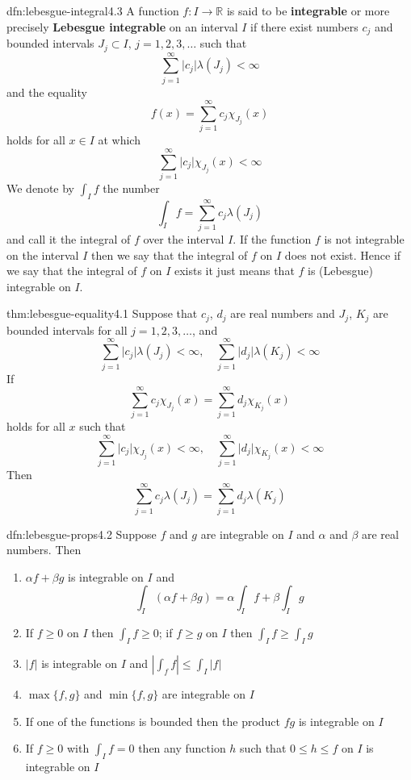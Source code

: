 \documentclass[landscape, 8pt]{extarticle}
\begin{document}
\begin{multicols}{3}
\begin{dfn}{dfn:lebesgue-integral}{4.3}
	A function $f:I\to \mathbb{R}$ is said to be \textbf{integrable} or more precisely \textbf{Lebesgue integrable} on an interval $I$ if there exist numbers $c_{j}$ and bounded intervals $J_{j}\subset I,\,j=1,2,3,\dots$ such that
	\[\sum_{j=1}^{\infty} \lvert c_{j} \rvert \lambda(J_{j})<\infty\]
	and the equality
	\[f(x)=\sum_{j=1}^{\infty} c_{j}\chi_{J_{j}}(x)\]
	holds for all $x\in I$ at which
	\[\sum_{j=1}^{\infty} \lvert c_{j} \rvert \chi_{J_{j}}(x)<\infty\]
	We denote by $\int_{I}f$ the number
	\[\int _{I}f=\sum_{j=1}^{\infty} c_{j}\lambda(J_{j})\]
	and call it the integral of $f$ over the interval $I$.
	If the function $f$ is not integrable on the interval $I$ then we say that the integral of $f$ on $I$ does not exist. Hence if we say that the integral of $f$ on $I$ exists it just means that $f$ is (Lebesgue) integrable on $I$.
\end{dfn}

\begin{thm}{thm:lebesgue-equality}{4.1}
	Suppose that $c_{j}$, $d_{j}$ are real numbers and $J_{j}$, $K_{j}$ are bounded intervals for all $j=1,2,3,\dots$, and
	\[\sum_{j=1}^{\infty} \lvert c_{j} \rvert \lambda(J_{j})<\infty,\quad \sum_{j=1}^{\infty} \lvert d_{j} \rvert \lambda(K_{j})<\infty\]
	If
	\[\sum_{j=1}^{\infty} c_{j}\chi_{J_{j}}(x)=\sum_{j=1}^{\infty} d_{j}\chi_{K_{j}}(x)\]
	holds for all $x$ such that
	\[\sum_{j=1}^{\infty} \lvert c_{j} \rvert \chi_{J_{j}}(x)<\infty,\quad \sum_{j=1}^{\infty} \lvert d_{j} \rvert \chi_{K_{j}}(x)<\infty\]
	Then
	\[\sum_{j=1}^{\infty} c_{j}\lambda(J_{j})=\sum_{j=1}^{\infty} d_{j}\lambda(K_{j})\]
\end{thm}

\begin{thm}{dfn:lebesgue-props}{4.2}
	Suppose $f$ and $g$ are integrable on $I$ and $\alpha$ and $\beta$ are real numbers. Then
	\begin{enumerate}
		\setlength\itemsep{0em}
		\item $\alpha f + \beta g$ is integrable on $I$ and
		\[\int_{I} (\alpha f + \beta g)=\alpha\int_{I} f+\beta\int_{I} g\]
		\item If $f\ge 0$ on $I$ then $\int_{I}f\ge 0$; if $f\ge g$ on $I$ then $\int_{I}f\ge \int_{I}g$
		\item $\lvert f \rvert$ is integrable on $I$ and $\left\lvert  \int_{f}f  \right\rvert\le \int_{I}\lvert f \rvert$
		\item $\max\{f,g\}$ and $\min\{f,g\}$ are integrable on $I$
		\item If one of the functions is bounded then the product $fg$ is integrable on $I$
		\item If $f\ge 0$ with $\int_{I}f=0$ then any function $h$ such that $0\le h\le f$ on $I$ is integrable on $I$
	\end{enumerate}
\end{thm}


\end{multicols}
\end{document}
